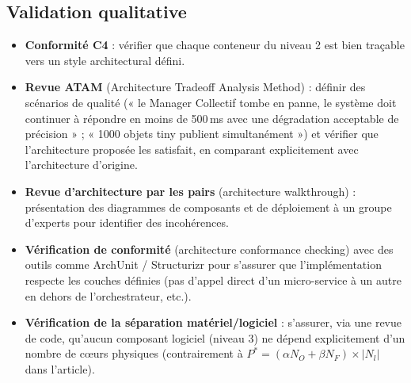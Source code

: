 \documentclass[11pt,a4paper]{article}
\begin{document}
\subsection{Validation qualitative}
\begin{itemize}
\item \textbf{Conformité C4} : vérifier que chaque conteneur du niveau 2 est bien traçable vers un style architectural défini.
\item \textbf{Revue ATAM} (Architecture Tradeoff Analysis Method) : définir des scénarios de qualité (« le Manager Collectif tombe en panne, le système doit continuer à répondre en moins de 500\,ms avec une dégradation acceptable de précision » ; « 1000 objets tiny publient simultanément ») et vérifier que l'architecture proposée les satisfait, en comparant explicitement avec l'architecture d'origine.
\item \textbf{Revue d'architecture par les pairs} (architecture walkthrough) : présentation des diagrammes de composants et de déploiement à un groupe d'experts pour identifier des incohérences.
\item \textbf{Vérification de conformité} (architecture conformance checking) avec des outils comme ArchUnit / Structurizr pour s'assurer que l'implémentation respecte les couches définies (pas d'appel direct d'un micro-service à un autre en dehors de l'orchestrateur, etc.).
\item \textbf{Vérification de la séparation matériel/logiciel} : s'assurer, via une revue de code, qu'aucun composant logiciel (niveau 3) ne dépend explicitement d'un nombre de cœurs physiques (contrairement à $P^{*} = (\alpha N_O + \beta N_F) \times |N_l|$ dans l'article).
\end{itemize}
\end{document}
